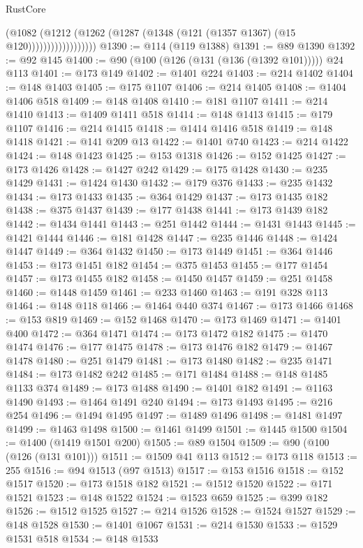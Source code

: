 \begin{lexlean}{RustCore}
\begin{coremodule}
                          (@1082
                            (@1212
                              (@1262 (@1287 (@1348 (@121 (@1357 @1367) (@15 @120))))))))))))))))))
@1390 := @114 (@119 @1388)
@1391 := @89 @1390
@1392 := @92 @145
@1400 := @90 (@100 (@126 (@131 (@136 (@1392 @101))))) @24 @113
@1401 := @173 @149
@1402 := @1401 @224
@1403 := @214 @1402
@1404 := @148 @1403
@1405 := @175 @1107
@1406 := @214 @1405
@1408 := @1404 @1406 @518
@1409 := @148 @1408
@1410 := @181 @1107
@1411 := @214 @1410
@1413 := @1409 @1411 @518
@1414 := @148 @1413
@1415 := @179 @1107
@1416 := @214 @1415
@1418 := @1414 @1416 @518
@1419 := @148 @1418
@1421 := @141 @209 @13
@1422 := @1401 @740
@1423 := @214 @1422
@1424 := @148 @1423
@1425 := @153 @1318
@1426 := @152 @1425
@1427 := @173 @1426
@1428 := @1427 @242
@1429 := @175 @1428
@1430 := @235 @1429
@1431 := @1424 @1430
@1432 := @179 @376
@1433 := @235 @1432
@1434 := @173 @1433
@1435 := @364 @1429
@1437 := @173 @1435 @182
@1438 := @375 @1437
@1439 := @177 @1438
@1441 := @173 @1439 @182
@1442 := @1434 @1441
@1443 := @251 @1442
@1444 := @1431 @1443
@1445 := @1421 @1444
@1446 := @181 @1428
@1447 := @235 @1446
@1448 := @1424 @1447
@1449 := @364 @1432
@1450 := @173 @1449
@1451 := @364 @1446
@1453 := @173 @1451 @182
@1454 := @375 @1453
@1455 := @177 @1454
@1457 := @173 @1455 @182
@1458 := @1450 @1457
@1459 := @251 @1458
@1460 := @1448 @1459
@1461 := @233 @1460
@1463 := @191 @328 @113
@1464 := @148 @118
@1466 := @1464 @440 @374
@1467 := @173 @1466
@1468 := @153 @819
@1469 := @152 @1468
@1470 := @173 @1469
@1471 := @1401 @400
@1472 := @364 @1471
@1474 := @173 @1472 @182
@1475 := @1470 @1474
@1476 := @177 @1475
@1478 := @173 @1476 @182
@1479 := @1467 @1478
@1480 := @251 @1479
@1481 := @173 @1480
@1482 := @235 @1471
@1484 := @173 @1482 @242
@1485 := @171 @1484
@1488 := @148 @1485 @1133 @374
@1489 := @173 @1488
@1490 := @1401 @182
@1491 := @1163 @1490
@1493 := @1464 @1491 @240
@1494 := @173 @1493
@1495 := @216 @254
@1496 := @1494 @1495
@1497 := @1489 @1496
@1498 := @1481 @1497
@1499 := @1463 @1498
@1500 := @1461 @1499
@1501 := @1445 @1500
@1504 := @1400 (@1419 @1501 @200)
@1505 := @89 @1504
@1509 := @90 (@100 (@126 (@131 @101)))
@1511 := @1509 @41 @113
@1512 := @173 @118
@1513 := 255
@1516 := @94 @1513 (@97 @1513)
@1517 := @153 @1516
@1518 := @152 @1517
@1520 := @173 @1518 @182
@1521 := @1512 @1520
@1522 := @171 @1521
@1523 := @148 @1522
@1524 := @1523 @659
@1525 := @399 @182
@1526 := @1512 @1525
@1527 := @214 @1526
@1528 := @1524 @1527
@1529 := @148 @1528
@1530 := @1401 @1067
@1531 := @214 @1530
@1533 := @1529 @1531 @518
@1534 := @148 @1533

\end{coremodule}
\end{lexlean}
